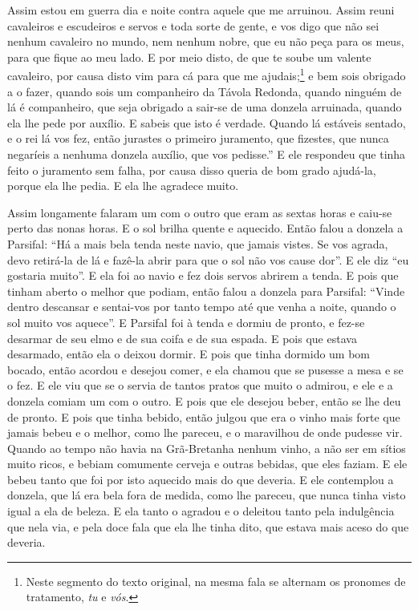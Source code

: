 Assim estou em guerra dia e noite contra aquele que me arruinou. Assim reuni
cavaleiros e escudeiros e servos e toda sorte de gente, e vos digo que não sei
nenhum cavaleiro no mundo, nem nenhum nobre, que eu não peça para os meus, para
que fique ao meu lado. E por meio disto, de que te soube um valente cavaleiro,
por causa disto vim para cá para que me ajudais;\footnote{ Neste segmento do
texto original, na mesma fala se alternam os pronomes de tratamento,
\textit{tu} e \textit{vós}.} e bem sois obrigado a o fazer,
quando sois um companheiro da Távola Redonda, quando ninguém de lá é
companheiro, que seja obrigado a sair-se de uma donzela arruinada, quando ela
lhe pede por auxílio. E sabeis que isto é verdade. Quando lá estáveis sentado,
e o rei lá vos fez, então jurastes o primeiro juramento, que fizestes, que
nunca negaríeis a nenhuma donzela auxílio, que vos pedisse.” E ele respondeu
que tinha feito o juramento sem falha, por causa disso queria de bom grado
ajudá-la, porque ela lhe pedia. E ela lhe agradece muito.

Assim longamente falaram um com o outro que eram as sextas horas e caiu-se
perto das nonas horas. E o sol brilha quente e aquecido. Então falou a donzela
a Parsifal: ``Há a mais bela tenda neste navio, que jamais vistes. Se vos
agrada, devo retirá-la de lá e fazê-la abrir para que o sol não vos cause dor”.
E ele diz ``eu gostaria muito''. E ela foi ao navio e fez dois servos abrirem a
tenda. E pois que tinham aberto o melhor que podiam, então falou a donzela para
Parsifal: “Vinde dentro descansar e sentai-vos por tanto tempo até que venha a
noite, quando o sol muito vos aquece”. E Parsifal foi à tenda e dormiu de
pronto, e fez-se desarmar de seu elmo e de sua coifa e de sua espada. E pois
que estava desarmado, então ela o deixou dormir. E pois que tinha dormido um
bom bocado, então acordou e desejou comer, e ela chamou que se pusesse a mesa e
se o fez. E ele viu que se o servia de tantos pratos que muito o admirou, e ele
e a donzela comiam um com o outro. E pois que ele desejou beber, então se lhe
deu de pronto. E pois que tinha bebido, então julgou que era o vinho mais forte
que jamais bebeu e o melhor, como lhe pareceu, e o maravilhou de onde pudesse
vir. Quando ao tempo não havia na Grã-Bretanha nenhum vinho, a não ser em
sítios muito ricos, e bebiam comumente cerveja e outras bebidas, que eles
faziam. E ele bebeu tanto que foi por isto aquecido mais do que
deveria. E ele contemplou a donzela, que lá era bela fora de medida, como lhe
pareceu, que nunca tinha visto igual a ela de beleza. E ela tanto o agradou e o
deleitou tanto pela indulgência que nela via, e pela doce fala que ela lhe
tinha dito, que estava mais aceso do que deveria.

